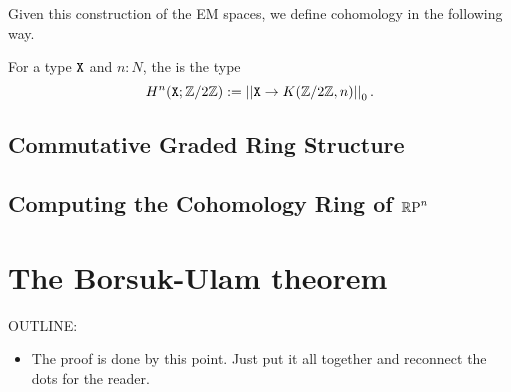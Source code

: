 \documentclass{amsart}
\begin{document}

Given this construction of the EM spaces, we define cohomology in the following way. 

\begin{definition}
	For a type $\mathtt{X}$ and $n:N$, the  is the type
	\[H^n(\mathtt{X};\mathbb{Z}/2\mathbb{Z}):= \left| \left| \mathtt{X}\rightarrow K(\mathbb{Z}/2\mathbb{Z},n)\right| \right|_0.\] 
\end{definition}


\subsection{Commutative Graded Ring Structure}

\subsection{Computing the Cohomology Ring of $\mathbb{R}\textrm{P}^n$}




\section{The Borsuk-Ulam theorem}
\label{sec:borsuk-ulam}

OUTLINE:
\begin{itemize}
\item
  The proof is done by this point. Just put it all
  together and reconnect the dots for the reader.
\end{itemize}



\nocite{shul:bfp,brunerie:thesis,br:rp-hott}

\end{document}
